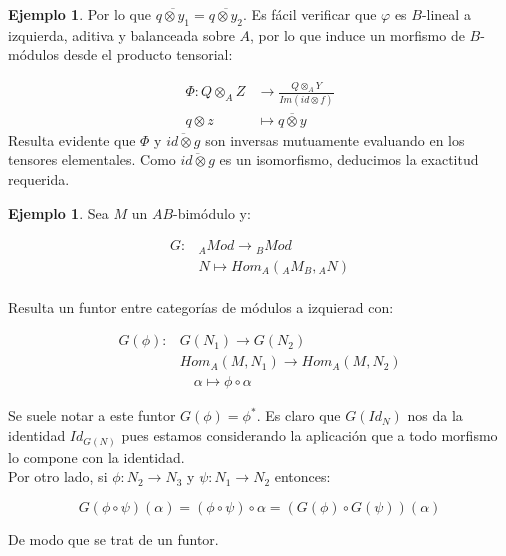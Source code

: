 \documentclass{article}
\theoremstyle{plain}
\theoremstyle{definition}
\newtheorem{ejemplo}[theorem]{Ejemplo}
\theoremstyle{remark}
\begin{document}
\begin{ejemplo}
        Por lo que $\overline{q \otimes y_1} = \overline{q \otimes y_2}$. Es fácil verificar que $\varphi$ es $B$-lineal a izquierda, aditiva y balanceada sobre $A$, por lo que induce un morfismo de $B$-módulos desde el producto tensorial:

        \begin{align*}
            \Phi: Q \otimes_A Z &\longrightarrow \frac{Q \otimes_A Y}{Im(id \otimes f)} \\
            q \otimes z &\longmapsto \overline{q \otimes y}
        \end{align*}
        Resulta evidente que $\Phi$ y $\overline{id \otimes g}$ son inversas mutuamente evaluando en los tensores elementales. Como $\overline{id \otimes g}$ es un isomorfismo, deducimos la exactitud requerida.
\end{ejemplo}

\begin{ejemplo}
    Sea $M$ un $AB$-bimódulo y:

    \begin{align*}
        G: & {}_AMod \longrightarrow {}_B Mod \\
        & N \mapsto Hom_A({}_AM_B,{}_AN) \\
    \end{align*}

    Resulta un funtor entre categorías de módulos a izquierad con:

    \begin{align*}
        G(\phi):  &G(N_1) \longrightarrow G(N_2) \\
        &Hom_A(M,N_1) \to Hom_A(M,N_2) \\
         & \quad \alpha \longmapsto \phi \circ\alpha
    \end{align*}

    Se suele notar a este funtor $G(\phi) = \phi^*$. Es claro que $G(Id_N)$ nos da la identidad $Id_{G(N)}$ pues estamos considerando la aplicación que a todo morfismo lo compone con la identidad. \\

    Por otro lado, si $\phi:N_2 \to N_3$ y $\psi: N_1 \to N_2$ entonces:

    \begin{equation*}
        G(\phi \circ \psi)(\alpha) = (\phi \circ\psi) \circ \alpha = (G(\phi) \circ G(\psi))(\alpha)
    \end{equation*}

    De modo que se trat de un funtor.

\end{ejemplo}
\end{document}
